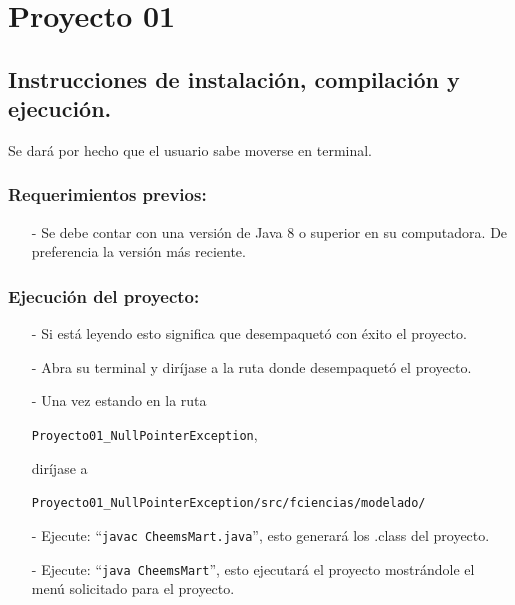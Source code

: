 \documentclass{article}
\newcommand{\code}[1]{\textcolor{white!25!black}{\texttt{#1}}}
\begin{document}

\section*{\LARGE{Proyecto 01}}

\subsection*{Instrucciones de instalación, compilación y ejecución.}
Se dará por hecho que el usuario sabe moverse en terminal.
\subsubsection*{Requerimientos previos:}
\begin{itemize}
\item[-] Se debe contar con una versión de Java $8$ o superior en su computadora. De preferencia la versión más reciente.
\end{itemize}

\subsubsection*{Ejecución del proyecto:}
\begin{itemize}
\item[-] Si está leyendo esto significa que desempaquetó con éxito el proyecto.
\item[-] Abra su terminal y diríjase a la ruta donde desempaquetó el proyecto.
\item[-] Una vez estando en la ruta
  
  \code{Proyecto01\_NullPointerException},
  
  diríjase a

  \code{Proyecto01\_NullPointerException/src/fciencias/modelado/}
\item[-] Ejecute: “\code{javac CheemsMart.java}”, esto generará los .class del proyecto.
\item[-] Ejecute: “\code{java CheemsMart}”, esto ejecutará el proyecto mostrándole el menú solicitado para el proyecto.
\end{itemize}
\end{document}
